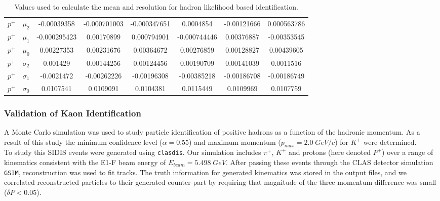 \begin{landscape}
\begin{table}
\begin{tabular}{c|c|c|c|c|c|c|c}
     $p^+$ & $\mu_2$ & -0.00039358 &       -0.000701003 &       -0.000347651 &          0.0004854 &        -0.00121666  &       0.000563786 \\
     $p^+$ & $\mu_1$ & -0.000295423 &         0.00170899 &        0.000794901 &       -0.000744446 &         0.00376887 &        -0.00353545 \\
     $p^+$ & $\mu_0$ & 0.00227353 &         0.00231676 &         0.00364672 &         0.00276859 &         0.00128827 &          0.00439605 \\
  $p^+$ & $\sigma_2$ & 0.001429 &         0.00144256 &         0.00124456 &         0.00190709 &         0.00141039 &          0.0011516 \\
  $p^+$ & $\sigma_1$ & -0.0021472 &        -0.00262226 &        -0.00196308 &        -0.00385218 &        -0.00186708 &        -0.00186749 \\
  $p^+$ & $\sigma_0$ & 0.0107541 &          0.0109091 &          0.0104381 &          0.0115449 &          0.0109969 &          0.0107759 
  \end{tabular}
  \caption{Values used to calculate the mean and resolution for hadron likelihood based identification.}
  \label{table-hadron-pdfs}
  \end{table}
\end{landscape}

\subsubsection*{Validation of Kaon Identification}
A Monte Carlo simulation was used to study particle identification of positive hadrons as a function of the hadronic momentum.  As a result of this study the minimum confidence level ($\alpha = 0.55$) and maximum momentum ($p_{max} = 2.0 \; GeV/c$) for $K^+$ were determined. \\

To study this SIDIS events were generated using \texttt{clasdis}.  Our simulation includes $\pi^+$, $K^+$ and protons (here denoted $P^+$) over a range of kinematics consistent with the E1-F beam energy of $E_{beam} = 5.498 \; GeV$.  After passing these events through the CLAS detector simulation \texttt{GSIM}, reconstruction was used to fit tracks.  The truth information for generated kinematics was stored in the output files, and we correlated reconstructed particles to their generated counter-part by requiring that magnitude of the three momentum difference was small ($\delta P < 0.05$).  


